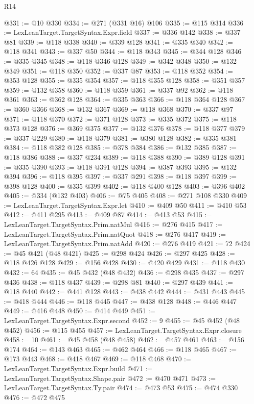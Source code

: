 \begin{lexlean}{R14}
\begin{coremodule}
@331 := @10 @330
@334 := @271 (@331 @16) @106
@335 := @115 @314
@336 := LexLeanTarget.TargetSyntax.Expr.field
@337 := @336 @142
@338 := @337 @81
@339 := @118 @338
@340 := @339 @128
@341 := @335 @340
@342 := @118 @341
@343 := @337 @50
@344 := @118 @343
@345 := @344 @128
@346 := @335 @345
@348 := @118 @346 @128
@349 := @342 @348
@350 := @132 @349
@351 := @118 @350
@352 := @337 @87
@353 := @118 @352
@354 := @353 @128
@355 := @335 @354
@357 := @118 @355 @128
@358 := @351 @357
@359 := @132 @358
@360 := @118 @359
@361 := @337 @92
@362 := @118 @361
@363 := @362 @128
@364 := @335 @363
@366 := @118 @364 @128
@367 := @360 @366
@368 := @132 @367
@369 := @118 @368
@370 := @337 @97
@371 := @118 @370
@372 := @371 @128
@373 := @335 @372
@375 := @118 @373 @128
@376 := @369 @375
@377 := @132 @376
@378 := @118 @377
@379 := @337 @229
@380 := @118 @379
@381 := @380 @128
@382 := @335 @381
@384 := @118 @382 @128
@385 := @378 @384
@386 := @132 @385
@387 := @118 @386
@388 := @337 @234
@389 := @118 @388
@390 := @389 @128
@391 := @335 @390
@393 := @118 @391 @128
@394 := @387 @393
@395 := @132 @394
@396 := @118 @395
@397 := @337 @291
@398 := @118 @397
@399 := @398 @128
@400 := @335 @399
@402 := @118 @400 @128
@403 := @396 @402
@405 := @334 (@132 @403)
@406 := @75 @405
@408 := @271 @108 @330
@409 := LexLeanTarget.TargetSyntax.Expr.let
@410 := @409 @50
@411 := @410 @53
@412 := @411 @295
@413 := @409 @87
@414 := @413 @53
@415 := LexLeanTarget.TargetSyntax.Prim.natMul
@416 := @276 @415
@417 := LexLeanTarget.TargetSyntax.Prim.natQuot
@418 := @276 @417
@419 := LexLeanTarget.TargetSyntax.Prim.natAdd
@420 := @276 @419
@421 := 72
@424 := @45 @421 (@48 @421)
@425 := @298 @424
@426 := @297 @425
@428 := @118 @426 @128
@429 := @156 @428
@430 := @420 @429
@431 := @118 @430
@432 := 64
@435 := @45 @432 (@48 @432)
@436 := @298 @435
@437 := @297 @436
@438 := @118 @437
@439 := @298 @81
@440 := @297 @439
@441 := @118 @440
@442 := @441 @128
@443 := @438 @442
@444 := @431 @443
@445 := @418 @444
@446 := @118 @445
@447 := @438 @128
@448 := @446 @447
@449 := @416 @448
@450 := @414 @449
@451 := LexLeanTarget.TargetSyntax.Expr.second
@452 := 9
@455 := @45 @452 (@48 @452)
@456 := @115 @455
@457 := LexLeanTarget.TargetSyntax.Expr.closure
@458 := 10
@461 := @45 @458 (@48 @458)
@462 := @457 @461
@463 := @156 @174
@464 := @143 @463
@465 := @462 @464
@466 := @118 @465
@467 := @173 @443
@468 := @418 @467
@469 := @118 @468
@470 := LexLeanTarget.TargetSyntax.Expr.build
@471 := LexLeanTarget.TargetSyntax.Shape.pair
@472 := @470 @471
@473 := LexLeanTarget.TargetSyntax.Ty.pair
@474 := @473 @53
@475 := @474 @330
@476 := @472 @475

\end{coremodule}
\end{lexlean}
